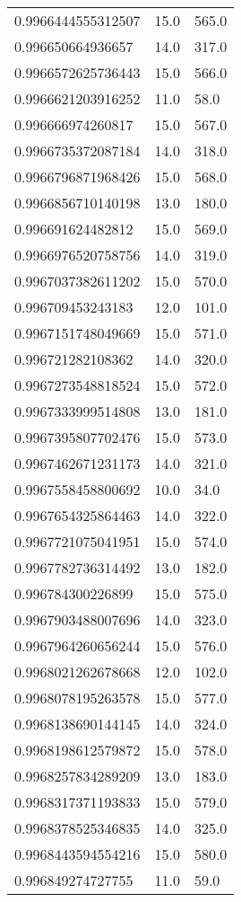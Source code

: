 \begin{center}
\begin{supertabular}[H]{p{0.30\textwidth}p{0.05\textwidth}p{0.05\textwidth}}
0.9966444555312507 & 15.0 & 565.0 \\ 
0.996650664936657 & 14.0 & 317.0 \\ 
0.9966572625736443 & 15.0 & 566.0 \\ 
0.9966621203916252 & 11.0 & 58.0 \\ 
0.996666974260817 & 15.0 & 567.0 \\ 
0.9966735372087184 & 14.0 & 318.0 \\ 
0.9966796871968426 & 15.0 & 568.0 \\ 
0.9966856710140198 & 13.0 & 180.0 \\ 
0.996691624482812 & 15.0 & 569.0 \\ 
0.9966976520758756 & 14.0 & 319.0 \\ 
0.9967037382611202 & 15.0 & 570.0 \\ 
0.996709453243183 & 12.0 & 101.0 \\ 
0.9967151748049669 & 15.0 & 571.0 \\ 
0.996721282108362 & 14.0 & 320.0 \\ 
0.9967273548818524 & 15.0 & 572.0 \\ 
0.9967333999514808 & 13.0 & 181.0 \\ 
0.9967395807702476 & 15.0 & 573.0 \\ 
0.9967462671231173 & 14.0 & 321.0 \\ 
0.9967558458800692 & 10.0 & 34.0 \\ 
0.9967654325864463 & 14.0 & 322.0 \\ 
0.9967721075041951 & 15.0 & 574.0 \\ 
0.9967782736314492 & 13.0 & 182.0 \\ 
0.996784300226899 & 15.0 & 575.0 \\ 
0.9967903488007696 & 14.0 & 323.0 \\ 
0.9967964260656244 & 15.0 & 576.0 \\ 
0.9968021262678668 & 12.0 & 102.0 \\ 
0.9968078195263578 & 15.0 & 577.0 \\ 
0.9968138690144145 & 14.0 & 324.0 \\ 
0.9968198612579872 & 15.0 & 578.0 \\ 
0.9968257834289209 & 13.0 & 183.0 \\ 
0.9968317371193833 & 15.0 & 579.0 \\ 
0.9968378525346835 & 14.0 & 325.0 \\ 
0.9968443594554216 & 15.0 & 580.0 \\ 
0.996849274727755 & 11.0 & 59.0 \\ 

\end{supertabular}
\end{center}
